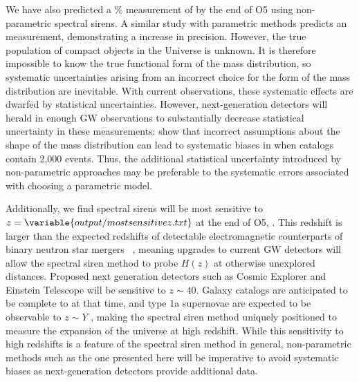 \documentclass[]{aastex631}
\begin{document}
We have also predicted a \% measurement of \Ho{} by the end of \ac{O5} using non-parametric spectral sirens.
A similar study with parametric methods \citep{Chen:2024gdn} predicts an  measurement, demonstrating a  increase in precision.
However, the true population of compact objects in the Universe is unknown.
It is therefore impossible to know the true functional form of the mass distribution, so systematic uncertainties arising from an incorrect choice for the form of the mass distribution are inevitable.
With current observations, these systematic effects are dwarfed by statistical uncertainties.
However, next-generation detectors will herald in enough \ac{GW} observations to substantially decrease statistical uncertainty in these measurements: \citet{pierra_study_2023} show that incorrect assumptions about the shape of the mass distribution can lead to  systematic biases in \Ho when catalogs contain 2,000 events.
Thus, the additional statistical uncertainty introduced by non-parametric approaches may be preferable to the systematic errors associated with choosing a parametric model.

Additionally, we find spectral sirens will be most sensitive to $z=\variable{output/mostsensitivez.txt}$ at the end of \acf{O5}, .
This redshift is larger than the expected redshifts of detectable electromagnetic counterparts of binary neutron star mergers ~\citep{kiendrebogo_observing_2023}, meaning upgrades to current \ac{GW} detectors will allow the spectral siren method to probe $H(z)$ at otherwise unexplored distances.
Proposed next generation detectors such as Cosmic Explorer and Einstein Telescope will be sensitive to $z\sim40$.
Galaxy catalogs are anticipated to be complete to  at that time, and type 1a supernovae are expected to be observable to $z\sim Y$ , making the spectral siren method uniquely positioned to measure the expansion of the universe at high redshift.
While this sensitivity to high redshifts is a feature of the spectral siren method in general, non-parametric methods such as the one presented here will be imperative to avoid systematic biases as next-generation detectors provide additional data. 
\end{document}
